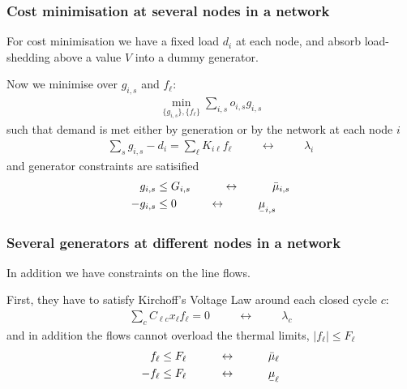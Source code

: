 \documentclass[10pt,aspectratio=169,dvipsnames]{beamer}
\def\l{\lambda}
\def\m{\mu}
\newcommand{\ubar}[1]{\text{\b{$#1$}}}
\begin{document}
\begin{frame}[fragile]
  \frametitle{Cost minimisation at several nodes in a network}

  For cost minimisation we have a fixed load $d_i$ at each node, and
  absorb load-shedding above a value $V$ into a dummy generator.

  Now we minimise over $g_{i,s}$ and $f_\ell$:
  \begin{align*}
    \min_{\{g_{i,s}\},\{f_\ell\}}  \sum_{i,s} o_{i,s} g_{i,s}
  \end{align*}
  such that demand is met either by generation or by the network at each node $i$
  \begin{align*}
    \sum_{s} g_{i,s} - d_i = \sum_\ell K_{i\ell}f_\ell  \hspace{1cm}\leftrightarrow\hspace{1cm} \l_i
  \end{align*}
  and generator constraints are satisified
    \begin{align*}
        g_{i,s}  & \leq  G_{i,s}  \hspace{1cm}\leftrightarrow\hspace{1cm} \bar{\m}_{i,s} \\
    - g_{i,s}  & \leq  0  \hspace{1cm}\leftrightarrow\hspace{1cm} \ubar{\m}_{i,s}
  \end{align*}



\end{frame}

\begin{frame}[fragile]
  \frametitle{Several generators at different nodes in a network}

  In addition we have constraints on the line flows.

  First, they have to satisfy Kirchoff's Voltage Law around each closed cycle $c$:
  \begin{align*}
    \sum_{c} C_{\ell c} x_\ell f_\ell = 0  \hspace{1cm}\leftrightarrow\hspace{1cm} \l_c
  \end{align*}
  and in addition the flows cannot overload the thermal limits, $|f_\ell| \leq F_\ell$
  \begin{align*}
    f_\ell \leq F_\ell  \hspace{1cm}\leftrightarrow\hspace{1cm} \bar{\m}_\ell \\
        - f_\ell \leq F_\ell  \hspace{1cm}\leftrightarrow\hspace{1cm} \ubar{\m}_\ell
  \end{align*}

\end{frame}
\end{document}
